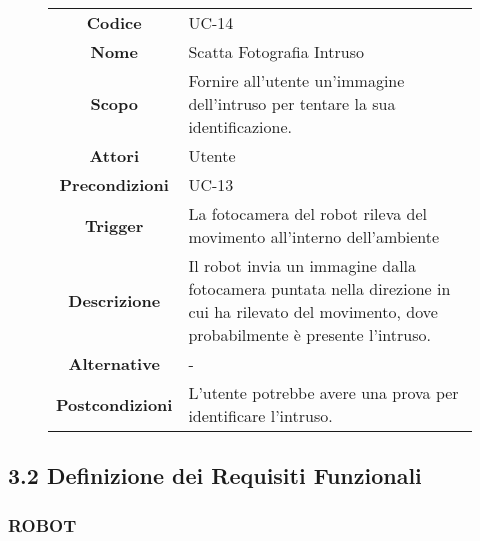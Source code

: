 \documentclass[]{article}
\begin{document}
\begin{figure}[htbp]
\centering
\begin{tabular}{|c|l|}
\hline

\textbf{Codice}
 & 
UC-14
\\

\textbf{Nome}
 & 
Scatta Fotografia Intruso
\\

\textbf{Scopo}
 & 
Fornire all'utente un'immagine dell'intruso per tentare la sua
identificazione.
\\

\textbf{Attori}
 & 
Utente
\\

\textbf{Precondizioni}
 & 
UC-13
\\

\textbf{Trigger}
 & 
La fotocamera del robot rileva del movimento all'interno
dell'ambiente
\\

\textbf{Descrizione}
 & 
Il robot invia un immagine dalla fotocamera puntata nella direzione in
cui ha rilevato del movimento, dove probabilmente è presente
l'intruso.
\\

\textbf{Alternative}
 & 
-
\\

\textbf{Postcondizioni}
 & 
L'utente potrebbe avere una prova per identificare l'intruso.
\\
\hline
\end{tabular}
\end{figure}

\hypertarget{definizione-dei-requisiti-funzionali}{%
\subsection{3.2 Definizione dei Requisiti
Funzionali}\label{definizione-dei-requisiti-funzionali}}

\hypertarget{robot}{%
\subsubsection{ROBOT}\label{robot}}
\end{document}
